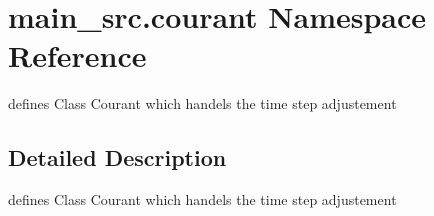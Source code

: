 \hypertarget{namespacemain__src_1_1courant}{\section{main\-\_\-src.\-courant Namespace Reference}
\label{namespacemain__src_1_1courant}
}


defines Class Courant which handels the time step adjustement  




\subsection{Detailed Description}
defines Class Courant which handels the time step adjustement 